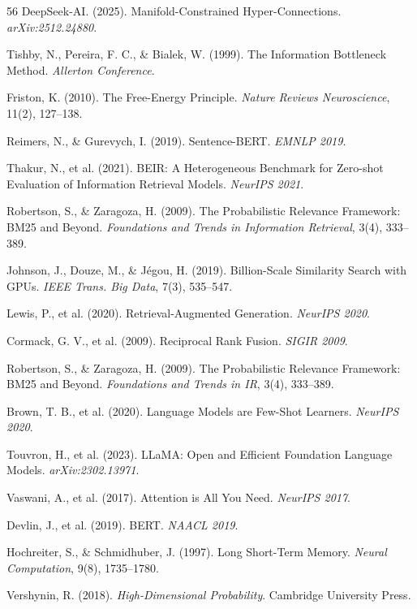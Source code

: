 \documentclass[12pt,a4paper]{article}
\theoremstyle{definition}
\theoremstyle{remark}
\begin{document}
\begin{thebibliography}{56}
 DeepSeek-AI. (2025). Manifold-Constrained Hyper-Connections. \textit{arXiv:2512.24880}.

 Tishby, N., Pereira, F. C., \& Bialek, W. (1999). The Information Bottleneck Method. \textit{Allerton Conference}.

 Friston, K. (2010). The Free-Energy Principle. \textit{Nature Reviews Neuroscience}, 11(2), 127--138.

 Reimers, N., \& Gurevych, I. (2019). Sentence-BERT. \textit{EMNLP 2019}.

 Thakur, N., et al. (2021). BEIR: A Heterogeneous Benchmark for Zero-shot Evaluation of Information Retrieval Models. \textit{NeurIPS 2021}.

 Robertson, S., \& Zaragoza, H. (2009). The Probabilistic Relevance Framework: BM25 and Beyond. \textit{Foundations and Trends in Information Retrieval}, 3(4), 333--389.

 Johnson, J., Douze, M., \& J\'{e}gou, H. (2019). Billion-Scale Similarity Search with GPUs. \textit{IEEE Trans. Big Data}, 7(3), 535--547.

 Lewis, P., et al. (2020). Retrieval-Augmented Generation. \textit{NeurIPS 2020}.

 Cormack, G. V., et al. (2009). Reciprocal Rank Fusion. \textit{SIGIR 2009}.

 Robertson, S., \& Zaragoza, H. (2009). The Probabilistic Relevance Framework: BM25 and Beyond. \textit{Foundations and Trends in IR}, 3(4), 333--389.

 Brown, T. B., et al. (2020). Language Models are Few-Shot Learners. \textit{NeurIPS 2020}.

 Touvron, H., et al. (2023). LLaMA: Open and Efficient Foundation Language Models. \textit{arXiv:2302.13971}.

 Vaswani, A., et al. (2017). Attention is All You Need. \textit{NeurIPS 2017}.

 Devlin, J., et al. (2019). BERT. \textit{NAACL 2019}.

 Hochreiter, S., \& Schmidhuber, J. (1997). Long Short-Term Memory. \textit{Neural Computation}, 9(8), 1735--1780.

 Vershynin, R. (2018). \textit{High-Dimensional Probability}. Cambridge University Press.


\end{thebibliography}
\end{document}
